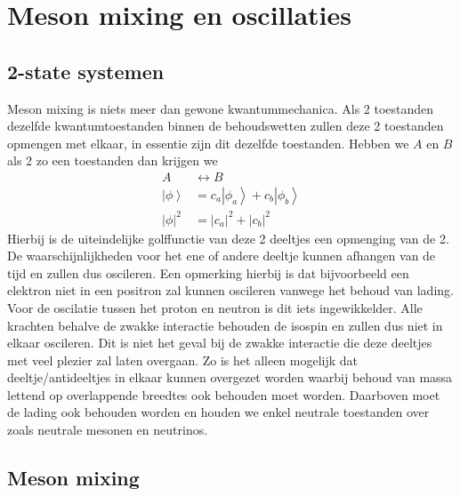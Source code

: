 \documentclass[../main.tex]{subfiles}
\begin{document}
\section{Meson mixing en oscillaties}%
\label{sec:meson_mixing_en_oscillaties}

\subsection{2-state systemen}%
\label{sub:2_state_systemen}

Meson mixing is niets meer dan gewone kwantummechanica. Als 2 toestanden dezelfde kwantumtoestanden binnen de behoudswetten zullen deze 2 toestanden opmengen met elkaar, in essentie zijn dit dezelfde toestanden. Hebben we $A$ en $B$ als 2 zo een toestanden dan krijgen we
\begin{equation}
    \begin{aligned}
        \label{eq:opmenhing_2_toestanden}
        A & \leftrightarrow B \\
        \left| \phi\right>&=c_{a}\left|\phi_{a}\right>+c_{b}\left| \phi_{b} \right>\\
        |\phi|^{2} &=\left|c_{a}\right|^{2}+\left|c_{b}\right|^{2}
    \end{aligned}
\end{equation}
Hierbij is de uiteindelijke golffunctie van deze 2 deeltjes een opmenging van de 2. De waarschijnlijkheden voor het ene of andere deeltje kunnen afhangen van de tijd en zullen dus oscileren. Een opmerking hierbij is dat bijvoorbeeld een elektron niet in een positron zal kunnen oscileren vanwege het behoud van lading. Voor de oscilatie tussen het proton en neutron is dit iets ingewikkelder. Alle krachten behalve de zwakke interactie behouden de isospin en zullen dus niet in elkaar oscileren. Dit is niet het geval bij de zwakke interactie die deze deeltjes met veel plezier zal laten overgaan. Zo is het alleen mogelijk dat deeltje/antideeltjes in elkaar kunnen overgezet worden waarbij behoud van massa lettend op overlappende breedtes ook behouden moet worden. Daarboven moet de lading ook behouden worden en houden we enkel neutrale toestanden over zoals neutrale mesonen en neutrinos.

\subsection{Meson mixing}%
\label{sub:meson_mixing}
\end{document}
